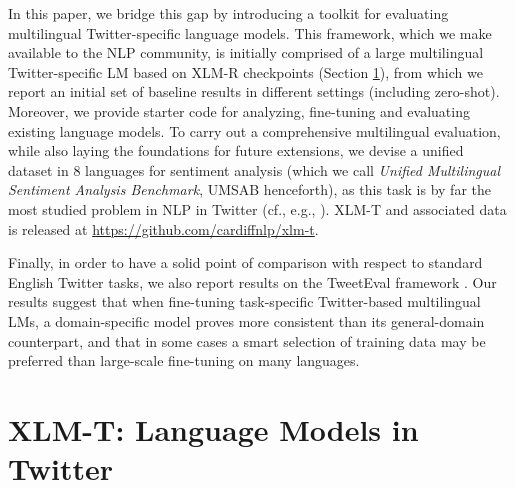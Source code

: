 \documentclass[10pt, a4paper]{article}
\begin{document}
In this paper, we bridge this gap by introducing a toolkit for evaluating multilingual Twitter-specific language models. This framework, which we make available to the NLP community, is initially comprised of a large multilingual Twitter-specific LM based on XLM-R checkpoints (Section \ref{sec:language_model_socialmedia}), from which we report an initial set of baseline results in different settings (including zero-shot). Moreover, we provide starter code for analyzing, fine-tuning and evaluating existing language models. To carry out a comprehensive multilingual evaluation, while also laying the foundations for future extensions, we devise a unified dataset in 8 languages for sentiment analysis (which we call \textit{Unified Multilingual Sentiment Analysis Benchmark}, UMSAB henceforth), as this task is by far the most studied problem in NLP in Twitter (cf., e.g., \cite{salameh2015,zhou2016,meng2012,chen2018adversarial,Rasooli2018,vilares2017,barnes-etal-2019-sentiment,patwa-etal-2020-semeval,barriere-balahur-2020-improving}). XLM-T and associated data is released at \url{https://github.com/cardiffnlp/xlm-t}.

Finally, in order to have a solid point of comparison with respect to standard English Twitter tasks, we also report results on the TweetEval framework \cite{barbieri-etal-2020-tweeteval}. Our results suggest that when fine-tuning task-specific Twitter-based multilingual LMs, a domain-specific model proves more consistent than its general-domain counterpart, and that in some cases a smart selection of training data may be preferred than large-scale fine-tuning on many languages.































\section{XLM-T: Language Models in Twitter}
\label{sec:language_model_socialmedia}
\end{document}
